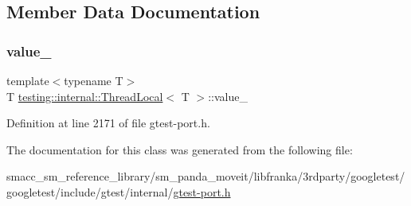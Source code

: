 \subsection{Member Data Documentation}
\mbox{\label{classtesting_1_1internal_1_1ThreadLocal_ae0db6b57bdb752feb343ee4d935708e2}} 
\subsubsection{\texorpdfstring{value\+\_\+}{value\_}}
{\footnotesize\ttfamily template$<$typename T$>$ \\
T \hyperlink{classtesting_1_1internal_1_1ThreadLocal}{testing\+::internal\+::\+Thread\+Local}$<$ T $>$\+::value\+\_\+\hspace{0.3cm}{\ttfamily [private]}}



Definition at line 2171 of file gtest-\/port.\+h.



The documentation for this class was generated from the following file\+:\begin{DoxyCompactItemize}
\item 
smacc\+\_\+sm\+\_\+reference\+\_\+library/sm\+\_\+panda\+\_\+moveit/libfranka/3rdparty/googletest/googletest/include/gtest/internal/\hyperlink{gtest-port_8h}{gtest-\/port.\+h}\end{DoxyCompactItemize}
